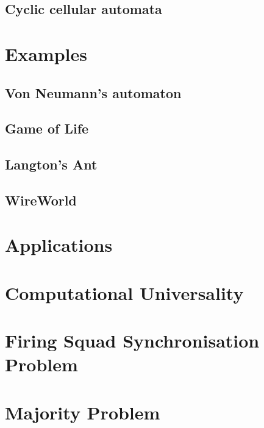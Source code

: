 \documentclass[11pt,a4paper]{article}
\begin{document}
    \subsection{Cyclic cellular automata}

\section{Examples}
    \subsection{Von Neumann's automaton}
    \subsection{Game of Life}
    \subsection{Langton's Ant}
    \subsection{WireWorld}
\section{Applications}
\section{Computational Universality}
\section{Firing Squad Synchronisation Problem}
\section{Majority Problem}


\end{document}
